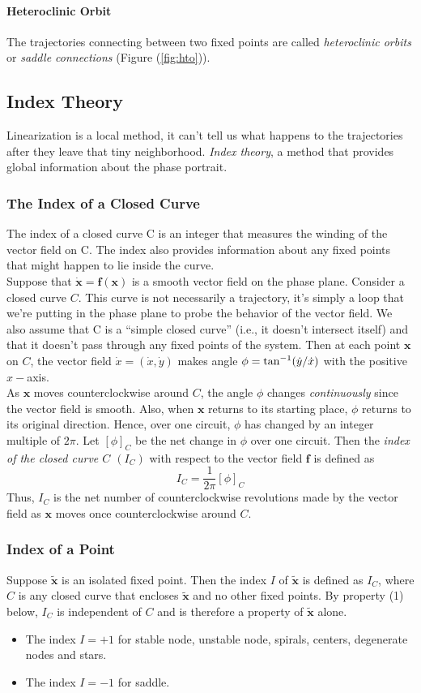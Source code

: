 \paragraph{Heteroclinic Orbit}
The trajectories connecting between two fixed points are called \emph{heteroclinic orbits} or \emph{saddle connections} (Figure (\ref{fig:hto})).
\subsection{Index Theory}
Linearization is a local method, it can’t tell us what happens to the trajectories after they leave that tiny neighborhood.
\emph{Index theory}, a method that provides global information about the phase portrait.
\subsubsection{The Index of a Closed Curve}
The index of a closed curve C is an integer that measures the winding of the
vector field on C.
The index also provides information about any fixed points that might happen to lie inside the curve.\\
Suppose that $\mathbf{\dot{x}=f(x)}$ is a smooth vector field on the phase plane.
Consider a closed curve $C$.
This curve is not necessarily a trajectory, it’s simply a loop that we’re putting in the phase plane to probe the behavior of the vector field.
We also assume that C is a “simple closed curve” (i.e., it doesn’t intersect itself) and that it doesn’t pass through any fixed points of the system.
Then at each point $\mathbf{x}$ on $C$, the vector field $\dot{x}=(\dot{x},\dot{y})$ makes angle $\phi=\tan^{-1}(\dot{y}/\dot{x})$ with the positive $x-$axis.\\
As $\mathbf{x}$ moves counterclockwise around $C$, the angle $\phi$ changes \emph{continuously} since the vector field is smooth.
Also, when $\mathbf{x}$ returns to its starting place, $\phi$ returns to its original direction.
Hence, over one circuit, $\phi$ has changed by an integer multiple of $2\pi$. Let $[\phi]_C$ be the net change in $\phi$ over one circuit.
Then the \emph{index of the closed curve $C$ $(I_C)$} with respect to the vector field $\mathbf{f}$ is defined as
\begin{equation}
	I_C=\frac{1}{2\pi}[\phi]_C
\end{equation}
Thus, $I_C$ is the net number of counterclockwise revolutions made by the vector field as $\mathbf{x}$ moves once counterclockwise around $C$.
\subsubsection{Index of a Point}
Suppose $\mathbf{\tilde{x}}$ is an isolated fixed point.
Then the index $I$ of $\mathbf{\tilde{x}}$ is defined as $I_C$, where $C$ is any closed curve that encloses $\mathbf{\tilde{x}}$ and no other fixed points.
By property (1) below, $I_C$ is independent of $C$ and is therefore a property of $\mathbf{\tilde{x}}$ alone.
\begin{itemize}
	\item The index $I=+1$ for stable node, unstable node, spirals, centers, degenerate nodes and stars.
	\item The index $I=-1$ for saddle.
\end{itemize}
